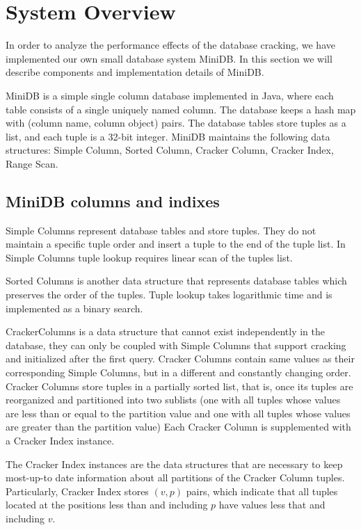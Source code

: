 \section{System Overview}
In  order to analyze the performance effects of the database cracking, we have implemented our own small database system MiniDB. In this section we will describe components and implementation details of MiniDB.

MiniDB is a simple single column database implemented in Java, where each table consists of a single uniquely named column. The database keeps a hash map with (column name, column object) pairs. The database tables store tuples as a list, and each tuple is a 32-bit integer. MiniDB maintains the following data structures: Simple Column, Sorted Column, Cracker Column, Cracker Index, Range Scan. 

\label{sec:system}

\subsection{MiniDB columns and indixes}


Simple Columns represent database tables and store tuples. They do not maintain a specific tuple order and insert a tuple to the end of the tuple list. In Simple Columns tuple lookup requires linear scan of the tuples list. 

Sorted Columns is another data structure that represents database tables  which preserves the order of the tuples. Tuple lookup takes logarithmic time and is implemented as a binary search. 

CrackerColumns is a data structure that cannot exist independently in the database, they can only be coupled with Simple Columns that support cracking and initialized after the first query. Cracker Columns contain same values as their corresponding Simple Columns, but in a different and constantly changing order. Cracker Columns store tuples in a partially sorted list, that is, once its tuples are reorganized and partitioned into two sublists (one with all tuples whose values are less than or equal to the partition value and one with all tuples whose values are greater than the partition value) Each Cracker Column is supplemented with a  Cracker Index instance. 

The Cracker Index instances are the data structures that are necessary to keep most-up-to date information about all partitions of the Cracker Column tuples. Particularly, Cracker Index stores $(v, p)$ pairs, which indicate that all tuples located at the positions less than and including $p$ have values less that and including $v$.

